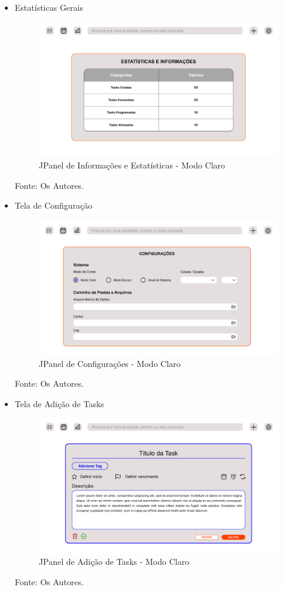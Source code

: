\documentclass[a4paper,12pt]{article}
\begin{document}
\begin{itemize}
	\pagebreak
	\item Estatísticas Gerais
	\begin{figure}[H]
		\centering
		\includegraphics[scale=0.20]{prototypes/white/Stats Panel Window.png}
		\caption{JPanel de Informações e Estatísticas - Modo Claro}
	\end{figure}
	\noindent Fonte: Os Autores.

	\item Tela de Configuração
	\begin{figure}[H]
		\centering
		\includegraphics[scale=0.20]{prototypes/white/Config Panel Window.png}
		\caption{JPanel de Configurações - Modo Claro}
	\end{figure}
	\noindent Fonte: Os Autores.

	\pagebreak
	\item Tela de Adição de Tasks
	\begin{figure}[H]
		\centering
		\includegraphics[scale=0.20]{prototypes/white/Add Task Panel Window.png}
		\caption{JPanel de Adição de Tasks - Modo Claro}
	\end{figure}
	\noindent Fonte: Os Autores.


\end{itemize}
\end{document}
